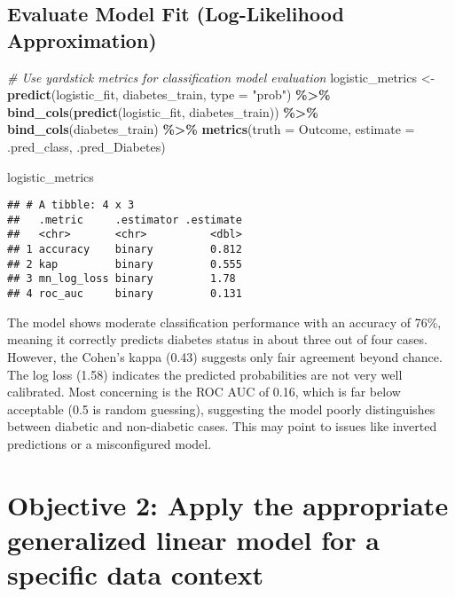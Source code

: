 \documentclass[
]{article}
\newenvironment{Shaded}{\begin{snugshade}}{\end{snugshade}}
\newcommand{\AttributeTok}[1]{\textcolor[rgb]{0.13,0.29,0.53}{#1}}
\newcommand{\CommentTok}[1]{\textcolor[rgb]{0.56,0.35,0.01}{\textit{#1}}}
\newcommand{\FunctionTok}[1]{\textcolor[rgb]{0.13,0.29,0.53}{\textbf{#1}}}
\newcommand{\NormalTok}[1]{#1}
\newcommand{\OtherTok}[1]{\textcolor[rgb]{0.56,0.35,0.01}{#1}}
\newcommand{\SpecialCharTok}[1]{\textcolor[rgb]{0.81,0.36,0.00}{\textbf{#1}}}
\newcommand{\StringTok}[1]{\textcolor[rgb]{0.31,0.60,0.02}{#1}}
\begin{document}
\subsection{Evaluate Model Fit (Log-Likelihood
Approximation)}\label{evaluate-model-fit-log-likelihood-approximation}

\begin{Shaded}
\begin{Highlighting}[]
\CommentTok{\# Use yardstick metrics for classification model evaluation}
\NormalTok{logistic\_metrics }\OtherTok{\textless{}{-}} \FunctionTok{predict}\NormalTok{(logistic\_fit, diabetes\_train, }\AttributeTok{type =} \StringTok{"prob"}\NormalTok{) }\SpecialCharTok{\%\textgreater{}\%}
  \FunctionTok{bind\_cols}\NormalTok{(}\FunctionTok{predict}\NormalTok{(logistic\_fit, diabetes\_train)) }\SpecialCharTok{\%\textgreater{}\%}
  \FunctionTok{bind\_cols}\NormalTok{(diabetes\_train) }\SpecialCharTok{\%\textgreater{}\%}
  \FunctionTok{metrics}\NormalTok{(}\AttributeTok{truth =}\NormalTok{ Outcome, }\AttributeTok{estimate =}\NormalTok{ .pred\_class, .pred\_Diabetes)}

\NormalTok{logistic\_metrics}
\end{Highlighting}
\end{Shaded}

\begin{verbatim}
## # A tibble: 4 x 3
##   .metric     .estimator .estimate
##   <chr>       <chr>          <dbl>
## 1 accuracy    binary         0.812
## 2 kap         binary         0.555
## 3 mn_log_loss binary         1.78 
## 4 roc_auc     binary         0.131
\end{verbatim}

The model shows moderate classification performance with an accuracy of
76\%, meaning it correctly predicts diabetes status in about three out
of four cases. However, the Cohen's kappa (0.43) suggests only fair
agreement beyond chance. The log loss (1.58) indicates the predicted
probabilities are not very well calibrated. Most concerning is the ROC
AUC of 0.16, which is far below acceptable (0.5 is random guessing),
suggesting the model poorly distinguishes between diabetic and
non-diabetic cases. This may point to issues like inverted predictions
or a misconfigured model.

\section{Objective 2: Apply the appropriate generalized linear model for
a specific data
context}\label{objective-2-apply-the-appropriate-generalized-linear-model-for-a-specific-data-context}
\end{document}
